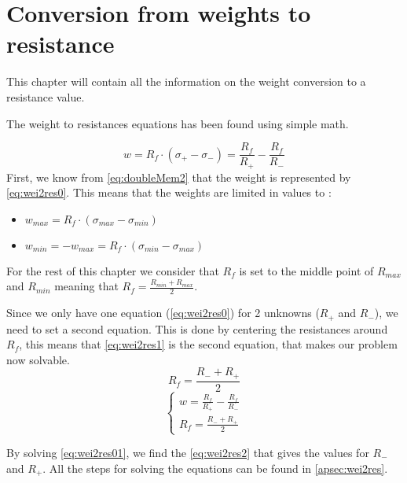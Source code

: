 \section{Conversion from weights to resistance}
\label{sec:wei2res}

This chapter will contain all the information on the weight conversion to a resistance value.

The weight to resistances equations has been found using simple math.

\begin{equation}
  \label{eq:wei2res0}
  w=R_f\cdot(\sigma_+-\sigma_-)=\frac{R_f}{R_+}-\frac{R_f}{R_-}
\end{equation}
First, we know from \cref{eq:doubleMem2} that the weight is represented by \cref{eq:wei2res0}. This means that the weights are limited in values to :

\begin{itemize}
  \item $w_{max}=R_f\cdot(\sigma_{max}-\sigma_{min})$
  \item $w_{min}=-w_{max}=R_f\cdot(\sigma_{min}-\sigma_{max})$
\end{itemize}

For the rest of this chapter we consider that $R_f$ is set to the middle point of $R_{max}$ and $R_{min}$ meaning that $R_f=\frac{R_{min}+R_{max}}{2}$.

Since we only have one equation (\cref{eq:wei2res0}) for 2 unknowns ($R_+$ and $R_-$), we need to set a second equation. This is done by centering the resistances around $R_f$, this means that \cref{eq:wei2res1} is the second equation, that makes our problem now solvable.
\begin{equation}
  \label{eq:wei2res1}
  R_f=\frac{R_-+R_+}{2}
\end{equation}
\begin{equation}
  \label{eq:wei2res01}
  \begin{cases}
    w=\frac{R_f}{R_+}-\frac{R_f}{R_-}\\
    R_f=\frac{R_-+R_+}{2}
  \end{cases}
\end{equation}

By solving \cref{eq:wei2res01}, we find the \cref{eq:wei2res2} that gives the values for $R_-$ and $R_+$. All the steps for solving the equations can be found in \cref{apsec:wei2res}.

